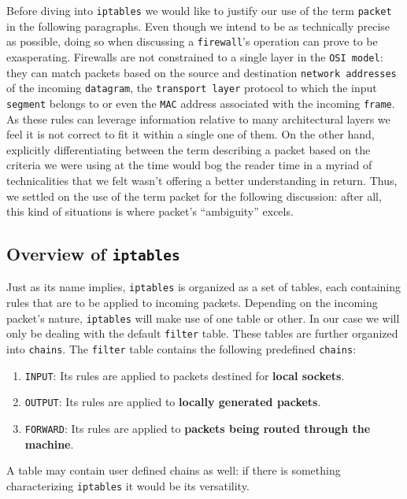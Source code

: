         Before diving into \texttt{iptables} we would like to justify our use of the term \texttt{packet} in the following paragraphs. Even though we intend to be as technically precise as possible, doing so when discussing a \texttt{firewall}'s operation can prove to be exasperating. Firewalls are not constrained to a single layer in the \texttt{OSI model}: they can match packets based on the source and destination \texttt{network addresses} of the incoming \texttt{datagram}, the \texttt{transport layer} protocol to which the input \texttt{segment} belongs to or even the \texttt{MAC} address associated with the incoming \texttt{frame}. As these rules can leverage information relative to many architectural layers we feel it is not correct to fit it within a single one of them. On the other hand, explicitly differentiating between the term describing a packet based on the criteria we were using at the time would bog the reader time in a myriad of technicalities that we felt wasn't offering a better understanding in return. Thus, we settled on the use of the term packet for the following discussion: after all, this kind of situations is where packet's ``ambiguity'' excels.

        \subsection{Overview of \texttt{iptables}}
            Just as its name implies, \texttt{iptables} is organized as a set of tables, each containing rules that are to be applied to incoming packets. Depending on the incoming packet's nature, \texttt{iptables} will make use of one table or other. In our case we will only be dealing with the default \texttt{filter} table. These tables are further organized into \texttt{chains}. The \texttt{filter} table contains the following predefined \texttt{chains}:

            \begin{enumerate}
                \item \texttt{INPUT}: Its rules are applied to packets destined for \textbf{local sockets}.
                \item \texttt{OUTPUT}: Its rules are applied to \textbf{locally generated packets}.
                \item \texttt{FORWARD}: Its rules are applied to \textbf{packets being routed through the machine}.
            \end{enumerate}

            A table may contain user defined chains as well: if there is something characterizing \texttt{iptables} it would be its versatility.

